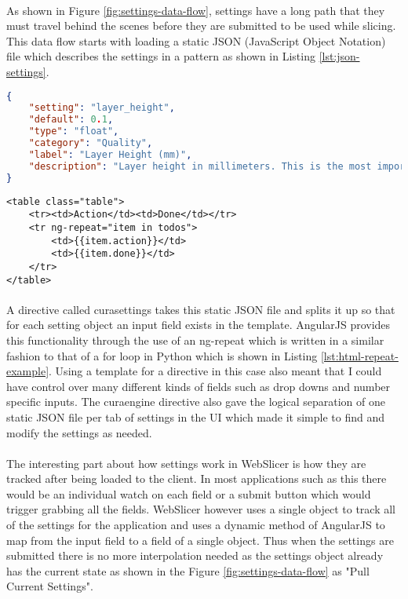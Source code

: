 \paragraph{}
As shown in Figure \ref{fig:settings-data-flow}, settings have a long path that they must travel behind the scenes before they are submitted to be used while slicing. 
This data flow starts with loading a static JSON (JavaScript Object Notation) file which describes the settings in a pattern as shown in Listing \ref{lst:json-settings}.
\begin{lstlisting}[language=json, style=thesiscode , label={lst:json-settings}, caption=A sample from a static settings file in JSON format.]
{
    "setting": "layer_height",
    "default": 0.1,
    "type": "float",
    "category": "Quality",
    "label": "Layer Height (mm)",
    "description": "Layer height in millimeters. This is the most important setting to determine the quality of your print. Normal quality prints are 0.1mm, high quality is 0.06mm. You can go up to 0.25mm."
}
\end{lstlisting}
\begin{lstlisting}[language=HTML5, style=thesiscode, label={lst:html-repeat-example}, caption=An example of a ng-repeat looping construct in HTML5.]
<table class="table">
	<tr><td>Action</td><td>Done</td></tr>
	<tr ng-repeat="item in todos">
		<td>{{item.action}}</td>
		<td>{{item.done}}</td>
	</tr>
</table>
\end{lstlisting}

\paragraph{}
A directive called curasettings takes this static JSON file and splits it up so that for each setting object an input field exists in the template.
AngularJS provides this functionality through the use of an ng-repeat which is written in a similar fashion to that of a for loop in Python which is shown in Listing \ref{lst:html-repeat-example}.
Using a template for a directive in this case also meant that I could have control over many different kinds of fields such as drop downs and number specific inputs.
The curaengine directive also gave the logical separation of one static JSON file per tab of settings in the UI which made it simple to find and modify the settings as needed.

\paragraph{}
The interesting part about how settings work in WebSlicer is how they are tracked after being loaded to the client.
In most applications such as this there would be an individual watch on each field or a submit button which would trigger grabbing all the fields.
WebSlicer however uses a single object to track all of the settings for the application and uses a dynamic method of AngularJS to map from the input field to a field of a single object.
Thus when the settings are submitted there is no more interpolation needed as the settings object already has the current state as shown in the Figure \ref{fig:settings-data-flow} as "Pull Current Settings".

